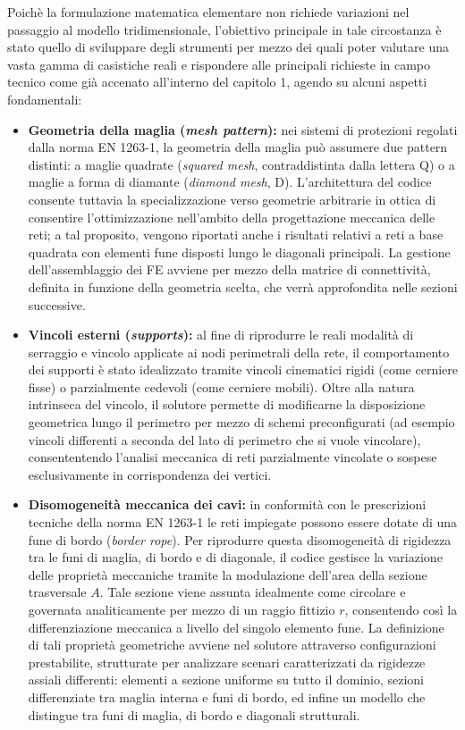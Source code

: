 Poichè la formulazione matematica elementare non richiede variazioni nel passaggio al modello tridimensionale, l'obiettivo principale in tale circostanza è stato quello di sviluppare degli strumenti per mezzo dei quali poter valutare una vasta gamma di casistiche reali e rispondere alle principali richieste in campo tecnico come già accenato all'interno del capitolo 1, agendo su alcuni aspetti fondamentali: 
\begin{itemize}
   \item \textbf{Geometria della maglia (\textit{mesh pattern}):} nei sistemi di protezioni regolati dalla norma EN 1263-1\cite{EN1263-1}, la geometria della maglia può assumere due pattern distinti: a maglie quadrate (\textit{squared mesh}, contraddistinta dalla lettera Q) o a maglie a forma di diamante (\textit{diamond mesh}, D). L'architettura del codice consente tuttavia la specializzazione verso geometrie arbitrarie in ottica di consentire l'ottimizzazione nell'ambito della progettazione meccanica delle reti; a tal proposito, vengono riportati anche i risultati relativi a reti a base quadrata con elementi fune disposti lungo le diagonali principali. La gestione dell'assemblaggio dei FE avviene per mezzo della matrice di connettività, definita in funzione della geometria scelta, che verrà approfondita nelle sezioni successive. 
   \item \textbf{Vincoli esterni (\textit{supports}):} al fine di riprodurre le reali modalità di serraggio e vincolo applicate ai nodi perimetrali della rete, il comportamento dei supporti è stato idealizzato tramite vincoli cinematici rigidi (come cerniere fisse) o parzialmente cedevoli (come cerniere mobili). Oltre alla natura intrinseca del vincolo, il solutore permette di modificarne la disposizione geometrica lungo il perimetro per mezzo di schemi preconfigurati (ad esempio vincoli differenti a seconda del lato di perimetro che si vuole vincolare), consententendo l'analisi meccanica di reti parzialmente vincolate o sospese esclusivamente in corrispondenza dei vertici. 
   \item \textbf{Disomogeneità meccanica dei cavi:} in conformità con le prescrizioni tecniche della norma EN 1263-1\cite{EN1263-1} le reti impiegate possono essere dotate di una fune di bordo (\textit{border rope}). Per riprodurre questa disomogeneità di rigidezza tra le funi di maglia, di bordo e di diagonale, il codice gestisce la variazione delle proprietà meccaniche tramite la modulazione dell'area della sezione trasversale $A$. Tale sezione viene assunta idealmente come circolare e governata analiticamente per mezzo di un raggio fittizio $r$, consentendo così la differenziazione meccanica a livello del singolo elemento fune. La definizione di tali proprietà geometriche avviene nel solutore attraverso configurazioni prestabilite, strutturate per analizzare scenari caratterizzati da rigidezze assiali differenti: elementi a sezione uniforme su tutto il dominio, sezioni differenziate tra maglia interna e funi di bordo, ed infine un modello che distingue tra funi di maglia, di bordo e diagonali strutturali. 

\end{itemize}
